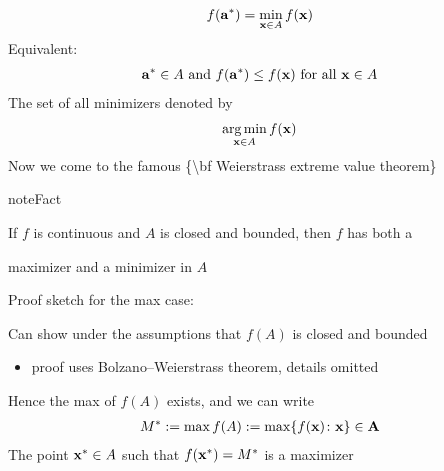 \documentclass[letterpaper,10pt,english]{jupyterBook}
\begin{document}
\begin{equation*}
\begin{split}
%
f({\bf a}^*) = \min_{{\bf x} \in A} f({\bf x})
%
\end{split}
\end{equation*}
\sphinxAtStartPar
Equivalent:
\begin{equation*}
\begin{split}
%
{\bf a}^* \in A \text{ and } f({\bf a}^*) \leq f({\bf x}) \text{ for all
} {\bf x} \in A
%
\end{split}
\end{equation*}
\sphinxAtStartPar
The set of all minimizers denoted by
\begin{equation*}
\begin{split}\operatorname*{arg\,min}_{{\bf x} \in A}f({\bf x})\end{split}
\end{equation*}
\sphinxAtStartPar
Now we come to the famous \{\textbackslash{}bf Weierstrass extreme value theorem\}

\begin{sphinxadmonition}{note}{Fact}

\sphinxAtStartPar
If \(f\) is continuous and \(A\) is closed and bounded, then \(f\) has both a
\end{sphinxadmonition}

\sphinxAtStartPar
maximizer and a minimizer in \(A\)

\sphinxAtStartPar
Proof sketch for the max case:

\sphinxAtStartPar
Can show under the assumptions that \(f(A)\) is closed and bounded
\begin{itemize}
\item {} 
\sphinxAtStartPar
proof uses Bolzano–Weierstrass theorem, details omitted

\end{itemize}

\sphinxAtStartPar
Hence the max of \(f(A)\) exists, and we can write
\begin{equation*}
\begin{split}
%
M^* := \max f(A) := \max \{ f({\bf x}) \colon {\bf x \} \in A}
%
\end{split}
\end{equation*}
\sphinxAtStartPar
The point \({\bf x}^* \in A\) such that \(f({\bf x}^*) = M^*\) is a maximizer
\end{document}
